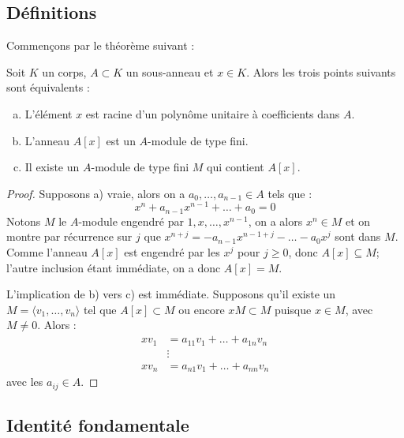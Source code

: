 \documentclass[a4paper]{article} %
\numberwithin{section}{part}
\numberwithin{equation}{section}
\begin{document}
\subsection{Définitions}
Commençons par le théorème suivant :
\begin{thm}
Soit $K$ un corps, $A\subset K$ un sous-anneau et $x\in K$. Alors les trois
points suivants sont équivalents :
\begin{enumerate}[a)]
\item L'élément $x$ est racine d'un polynôme unitaire à coefficients dans $A$.

\item L'anneau $A[x]$ est un $A$-module de type fini.

\item Il existe un $A$-module de type fini $M$ qui contient $A[x]$.

\end{enumerate}
\end{thm}
\begin{proof}
Supposons a) vraie, alors on a $a_0,\dots,a_{n-1}\in A$ tels que :
\[x^n + a_{n-1}x^{n-1} + \dots + a_0 = 0\]
Notons $M$ le $A$-module engendré par $1, x,\dots, x^{n-1}$, on a alors $x^n\in
M$ et on montre par récurrence sur $j$ que $x^{n+j} = -a_{n-1}x^{n-1 +
j}-\dots- a_0x^j$ sont dans $M$. Comme l'anneau $A[x]$ est engendré par les
$x^j$ pour $j\geq0$, donc $A[x] \subseteq M$; l'autre inclusion étant immédiate,
on a donc $A[x] = M$.\par
L'implication de b) vers c) est immédiate. Supposons qu'il existe un $M =
\langle{v_1,\dots,v_n}\rangle$ tel que $A[x]\subset M$ ou encore $xM \subset M$
puisque $x\in M$, avec $M\neq 0$. Alors :
\begin{align*}
xv_1 &= a_{11}v_1 + \dots + a_{1n}v_n\\
&\vdots\\
xv_n &= a_{n1}v_1 + \dots + a_{nn}v_n
\end{align*}
avec les $a_{ij}\in A$. 
\end{proof}



\subsection{Identité fondamentale}
\end{document}
